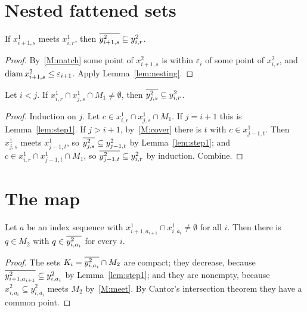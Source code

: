 
\section{Nested fattened sets}

\begin{lemma}[Step 1]\label{lem:step1}
If $x^1_{i+1,s}$ meets $x^1_{i,r}$, then $\overline{y^2_{i+1,s}}\subseteq y^2_{i,r}$.
\end{lemma}

\begin{proof}
By~\ref{M:match} some point of $x^2_{i+1,s}$ is within $\varepsilon_i$ of some point of $x^2_{i,r}$, and
$\operatorname{diam} x^2_{i+1,s}\le\varepsilon_{i+1}$. Apply Lemma~\ref{lem:nesting}.
\end{proof}


\begin{lemma}[Step 2]\label{lem:step2}
Let $i<j$. If $x^1_{i,r}\cap x^1_{j,s}\cap M_1\ne\emptyset$, then $\overline{y^2_{j,s}}\subseteq y^2_{i,r}$.
\end{lemma}

\begin{proof}
Induction on $j$. Let $c\in x^1_{i,r}\cap x^1_{j,s}\cap M_1$. If $j=i+1$ this is Lemma~\ref{lem:step1}. If $j>i+1$, by~\ref{M:cover} there is
$t$ with $c\in x^1_{j-1,t}$. Then $x^1_{j,s}$ meets $x^1_{j-1,t}$, so $\overline{y^2_{j,s}}\subseteq y^2_{j-1,t}$ by
Lemma~\ref{lem:step1}; and $c\in x^1_{i,r}\cap x^1_{j-1,t}\cap M_1$, so $\overline{y^2_{j-1,t}}\subseteq y^2_{i,r}$ by induction. Combine.
\end{proof}


\section{The map}

\begin{lemma}[Step 3]\label{lem:limit-point}
Let $a$ be an index sequence with $x^1_{i+1,a_{i+1}}\cap x^1_{i,a_i}\neq\emptyset$ for all $i$. Then there is $q\in M_2$ with
$q\in\overline{y^2_{i,a_i}}$ for every $i$.
\end{lemma}

\begin{proof}
The sets $K_i=\overline{y^2_{i,a_i}}\cap M_2$ are compact; they decrease, because $\overline{y^2_{i+1,a_{i+1}}}\subseteq y^2_{i,a_i}$ by
Lemma~\ref{lem:step1}; and they are nonempty, because $x^2_{i,a_i}\subseteq y^2_{i,a_i}$ meets $M_2$ by~\ref{M:meet}. By Cantor's
intersection theorem  they have a common point.
\end{proof}

